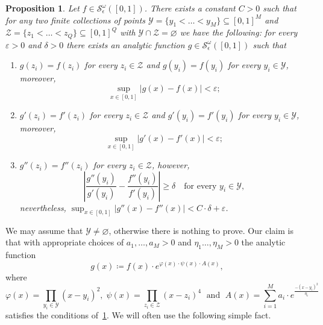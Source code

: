 \documentclass[11pt,a4paper]{article}
\def\cref#1{\ref{#1}}%
\newtheorem{proposition}[theorem]{Proposition}
\theoremstyle{definition}
\theoremstyle{remark}
\newcommand{\0}{\mathbf{0}}
\numberwithin{equation}{section}
\begin{document}
\begin{proposition}\label{prop:AnalyticBumpFunc}
Let $f\in \mathcal{S}^{\omega}_\epsilon([0,1])$. There exists a constant $C>0$ such that for
any two finite collections of points
$\mathcal{Y}=\{y_1<\ldots<y_M\}\subseteq[0,1]^M$ and $\mathcal{Z}=\{z_1<\ldots<
z_Q\}\subseteq[0,1]^Q$ with $\mathcal{Y}\cap\mathcal{Z}=\varnothing$ we have the following: for
every $\varepsilon>0$ and $\delta>0$ there exists an analytic function
$g\in\mathcal{S}^{\omega}_\epsilon([0,1])$ such that
\begin{enumerate}[label=(\roman*)]
\item $g(z_i)=f(z_i)$ for every $z_i\in\mathcal{Z}$ and $g(y_i)=f(y_i)$ for every $y_i\in\mathcal{Y}$, moreover,
\begin{equation*}
\sup_{x\in[0,1]}|g(x)-f(x)|<\varepsilon;
\end{equation*}
\item  $g'(z_i)=f'(z_i)$ for every $z_i\in\mathcal{Z}$ and $g'(y_i)=f'(y_i)$ for every $y_i\in\mathcal{Y}$, moreover,
\begin{equation*}
	\sup_{x\in[0,1]}|g'(x)-f'(x)|<\varepsilon;
\end{equation*}
\item $g''(z_i)=f''(z_i)$ for every $z_i\in\mathcal{Z}$, however,
\begin{equation*}
	\left| \frac{g''(y_i)}{g'(y_i)} - \frac{f''(y_i)}{f'(y_i)} \right|\geq \delta \quad\text{
	for every } y_i\in\mathcal{Y},
\end{equation*}
nevertheless, $	\sup_{x\in[0,1]}|g''(x)-f''(x)|<C\cdot \delta +\varepsilon$.
\end{enumerate}
\end{proposition}

We may assume that $\mathcal{Y}\neq\varnothing$, otherwise there is nothing to prove. Our claim is
that with appropriate choices of $a_1,\ldots,a_M>0$ and $\eta_1\ldots,\eta_M>0$ the analytic
function
\begin{equation}\label{eq:BumpFunc}
g(x)\coloneqq f(x)\cdot e^{\varphi(x)\cdot \psi(x)\cdot A(x)},
\end{equation} 
where
\begin{equation*}
\varphi(x)=\prod_{y_i\in\mathcal{Y}} (x-y_i)^2,\; \psi(x) = \prod_{z_i\in\mathcal{Z}} (x-z_i)^4
\;\text{ and }\; A(x)= \sum_{i=1}^{M} a_i\cdot e^{\frac{-(x-y_i)^2}{\eta_i}}
\end{equation*}
satisfies the conditions of~\cref{prop:AnalyticBumpFunc}. We will often use the following simple fact.
\end{document}
